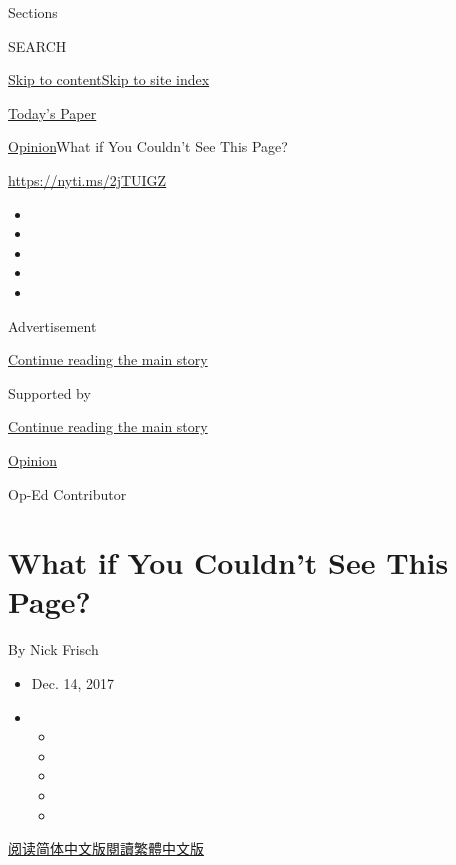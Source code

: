 Sections

SEARCH

\protect\hyperlink{site-content}{Skip to
content}\protect\hyperlink{site-index}{Skip to site index}

\href{https://myaccount.nytimes3xbfgragh.onion/auth/login?response_type=cookie\&client_id=vi}{}

\href{https://www.nytimes3xbfgragh.onion/section/todayspaper}{Today's
Paper}

\href{/section/opinion}{Opinion}\textbar{}What if You Couldn't See This
Page?

\url{https://nyti.ms/2jTUIGZ}

\begin{itemize}
\item
\item
\item
\item
\item
\end{itemize}

Advertisement

\protect\hyperlink{after-top}{Continue reading the main story}

Supported by

\protect\hyperlink{after-sponsor}{Continue reading the main story}

\href{/section/opinion}{Opinion}

Op-Ed Contributor

\hypertarget{what-if-you-couldnt-see-this-page}{%
\section{What if You Couldn't See This
Page?}\label{what-if-you-couldnt-see-this-page}}

By Nick Frisch

\begin{itemize}
\item
  Dec. 14, 2017
\item
  \begin{itemize}
  \item
  \item
  \item
  \item
  \item
  \end{itemize}
\end{itemize}

\href{https://cn.nytimes3xbfgragh.onion/opinion/20171215/net-neutrality-china-internet/}{阅读简体中文版}\href{https://cn.nytimes3xbfgragh.onion/opinion/20171215/net-neutrality-china-internet/zh-hant/}{閱讀繁體中文版}

